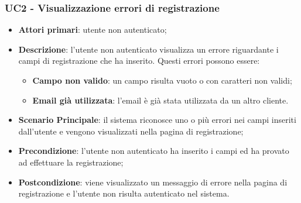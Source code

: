 \subsubsection{UC2 - Visualizzazione errori di registrazione}
\begin{itemize}
\item \textbf{Attori primari}: utente non autenticato;
\item \textbf{Descrizione}: l'utente non autenticato visualizza un errore riguardante i campi di registrazione che ha inserito. Questi errori possono essere:
\begin{itemize}
\item \textbf{Campo non valido}: un campo risulta vuoto o con caratteri non validi;
\item \textbf{Email già utilizzata}: l'email è già stata utilizzata da un altro cliente.
\end{itemize}
\item \textbf{Scenario Principale}: il sistema riconosce uno o più errori nei campi inseriti dall'utente e vengono visualizzati nella pagina di registrazione;
\item \textbf{Precondizione}: l'utente non autenticato ha inserito i campi ed ha provato ad effettuare la registrazione;
\item \textbf{Postcondizione}: viene visualizzato un messaggio di errore nella pagina di registrazione e l'utente non risulta autenticato nel sistema.
\end{itemize}

